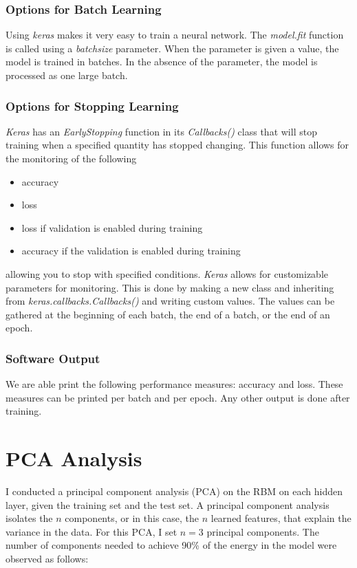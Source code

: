 \documentclass[11pt]{amsart}
\theoremstyle{remark}
\theoremstyle{remark}
\numberwithin{equation}{section}
\newcommand{\n}{\noindent}
\begin{document}
\subsubsection{Options for Batch Learning}

    Using \textit{keras} makes it very easy to train a neural network. The \textit{model.fit}
    function is called using a \textit{batch\textunderscore size} parameter. When the parameter
    is given a value, the model is trained in batches. In the absence of the parameter,
    the model is processed as one large batch.
    
\subsubsection{Options for Stopping Learning}

	\textit{Keras} has an \textit{EarlyStopping} function in its \textit{Callbacks()} 
	class that will stop training when a specified quantity has stopped changing.
	This function allows for the monitoring of the following
	\begin{itemize}
	\item accuracy
	\item loss
	\item loss if validation is enabled during training 
	\item accuracy if the validation is enabled during training
	\end{itemize}
	allowing you to stop with specified conditions. \textit{Keras} allows
	for customizable parameters for monitoring. This is done by making a new class
	and inheriting from \textit{keras.callbacks.Callbacks()} and writing custom 
	values. The values can be gathered at the beginning of each batch, the end of
	a batch, or the end of an epoch. 

  \subsubsection{Software Output}
  We are able print the following performance measures: accuracy and loss. These 
  measures can be printed per batch and per epoch. Any other output is done 
  after training.


\section{PCA Analysis}
I conducted a principal component analysis (PCA) on the RBM on each hidden layer, 
given the training set and the test set. A principal component analysis isolates the 
$n$ components, or in this case, the $n$ learned features, that explain the variance
in the data. For this PCA, I set $n=3$ principal components. The number of components
needed to achieve 90\% of the energy in the model were observed as follows: \n
 
\end{document}
